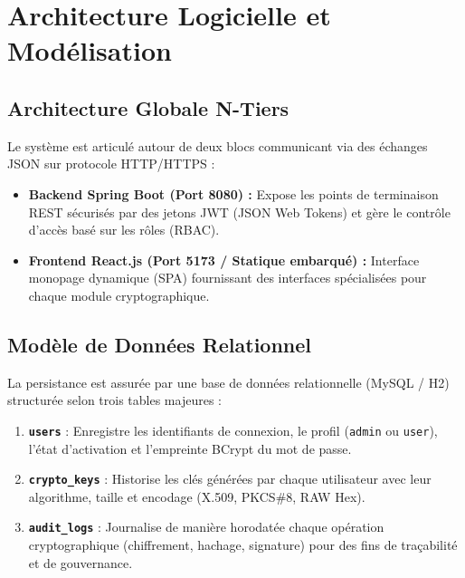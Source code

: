 \documentclass[12pt,a4paper]{report}
\begin{document}
\newpage

\chapter{Architecture Logicielle et Modélisation}

\section{Architecture Globale N-Tiers}
Le système est articulé autour de deux blocs communicant via des échanges JSON sur protocole HTTP/HTTPS :
\begin{itemize}
    \item \textbf{Backend Spring Boot (Port 8080) :} Expose les points de terminaison REST sécurisés par des jetons JWT (JSON Web Tokens) et gère le contrôle d'accès basé sur les rôles (RBAC).
    \item \textbf{Frontend React.js (Port 5173 / Statique embarqué) :} Interface monopage dynamique (SPA) fournissant des interfaces spécialisées pour chaque module cryptographique.
\end{itemize}

\section{Modèle de Données Relationnel}
La persistance est assurée par une base de données relationnelle (MySQL / H2) structurée selon trois tables majeures :
\begin{enumerate}
    \item \textbf{\texttt{users}} : Enregistre les identifiants de connexion, le profil (\texttt{admin} ou \texttt{user}), l'état d'activation et l'empreinte BCrypt du mot de passe.
    \item \textbf{\texttt{crypto\_keys}} : Historise les clés générées par chaque utilisateur avec leur algorithme, taille et encodage (X.509, PKCS\#8, RAW Hex).
    \item \textbf{\texttt{audit\_logs}} : Journalise de manière horodatée chaque opération cryptographique (chiffrement, hachage, signature) pour des fins de traçabilité et de gouvernance.
\end{enumerate}

\newpage

\end{document}
